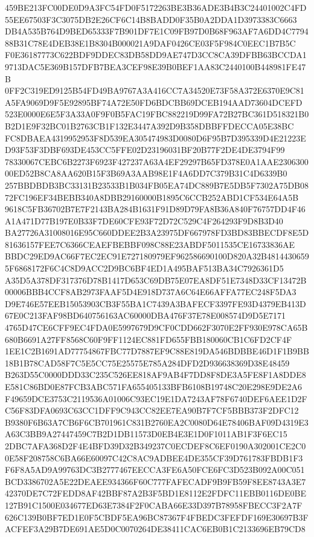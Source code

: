 \documentclass[UTF8,fontset=fandol,zihao=-4,a4paper]{ctexart}
\begin{document}
{{459BE213FC00DE0D9A3FC54FD0F5172263BE3B36ADE3B4B3C24401002C4FD55EE67503F3C3075DB2E26CF6C14B8BADD0F35B0A2DDA1D3973383C6663
DB4A535B764D9BED65333F7B901DF7E1C09FB97D0B68F963AF7A6DD4C779488B31C78E4DEB38E1B8304B000021A9DAF0426CE03F5F984C0EEC1B7B5C
F0E36187773C622BDF9DDEC83DB58DD9AE747D3CC8CA39DFBB63BCCDA19713DAC5E369B157DFB7BEA3CEF98E39B0BEF1AA83C2440100B448981FE47B
0FF2C319ED9125B54FD49BA9767A3A416CC7A34520E73F58A372E6370E9C81A5FA9069D9F5E92895BF74A72E50FD6BDCBB69DCEB194AAD73604DCEFD
523E0000E6E5F3A33A0F9F0B5FAC19FBC882219D99FA72B27BC361D518321B0B2D1E9F32BC01B2763CB1F132E3447A392D9B358DBBFFDECCA05E38BC
FC8DBAEA4319952953F8D539EA305474983D0080D6F95B7D395339D4E21223ED93F53F3DBF693DE453CC5FFE02D23196031BF20B77F2DE4DE3794F99
78330067CEBC6B2273F6923F427237A63A4EF29297B65FD378E0A1AAE230630000ED52B8CA8AA620B15F3B69A3AAB98E1F4A6DD7C379B31C4D6339B0
257BBDBDB3BC33131B23533B1B034FB05EA74DC889B7E5DB5F7302A75DB0872FC196EF34BEBB340A8DBB29160000B1895C6CCB252ABD1CF534E64A5B
9618C5FB36702B7E7F2143BA284B1631F91D89D79FA8B36A840F76757DD4F46A1A471D77B197E0B33F7DE60CFE93F72D72C529C4F264293F9D8B3D40
BA27726A31008016E95C660DDEE2B3A23975DF667978FD3BD83BBECDF8E5D81636157FEE7C6366CEAEFBEBBF098C88E23ABDF5011535CE16733836AE
BBDC29ED9AC66F7EC2EC91E727180979EF962586690100D820A32B48144306595F6868172F6C4C8D9ACC2D9BC6BF4ED1A495BAF513BA34C7926361D5
A35D5A378DF317376D78B1417D653C69DB75E07EA8DF51E7348D33CF13472B00006BBB4CCF8AB2973FAAF5D4E918D737A6C64E66AFFA77EC248F5DA3
D9E746E57EEB15053903CB3F55BA1C7439A3BAFECF3397FE93D4379EB413D67E0C213FAF98BD640756163AC60000DBA476F37E78E008574D9D5E7171
4765D47CE6CFF9EC4FDA0E5997679D9CF0CDD662F3070E2FF930E978CA65B680B6691A27FF8568C60F9FF1124EC881FD655FBB180060CB1C6FD2CF4F
1EE1C2B1691AD77754867FBC77D7887EF9C88E819DA546BDBBE46D1F1B9BB18B1B78CAD58F7C5E5CC75E25575E785A284DFD2D936638369D38E48459
B263D55C0000DDD33C235C526EE818AF9AB4F7DD8F8DE3A5FE8F1A8DDE8E581C86BD0E87FCB3ABC571FA655405133BFB6108B19748C20E298E9DE2A6
F49659DCE3753C2119536A01006C93EC19E1DA7243AF78F6740DEF6AEE1D2FC56F83DFA0693C63CC1DFF9C943CC82EE7EA90B7F7CF5BBB373F2DFC12
B9380F6B63A7CB6F6CB701961C831B2760EA2C0080D64E78406BAF09D4319E3A63C3BB9A27447459C7B2D1DB11573D0EB4E3E1D0F1011AB1F3F6EC15
2DBC7AFA368D2F4E4BFD39D32B349237C0ECDEF8C6EF0190A302001CE2C00E58F208758C6BA66E60097C42C8AC9ADBEE4DE355CF39D761783FBDB1F3
F6F8A5AD9A99763DC3B2777467EECCA3FE6A50FCE6FC3D523B092A00C051BCD3386702A5E22DEAEE934366F60C777FAFECADF9B9FB59F8EE8743A3E7
42370DE7C72FEDD8AF42BBF87A2B3F5BD1E8112E2FDFC11EBB0116DE0BE127B91C1500E034677ED63E7384F2F0CABA66E33D397B78958FBECC3F2A7F
626C139B0BF7ED1E0F5CBDF5EA96BC87367F4FBEDC3FEFDF169E30697B3FACFEF3A29B7DE691AE5D0C0070264DE38411CAC6EB0B1C2133696EB79CD8
}}
\end{document}
